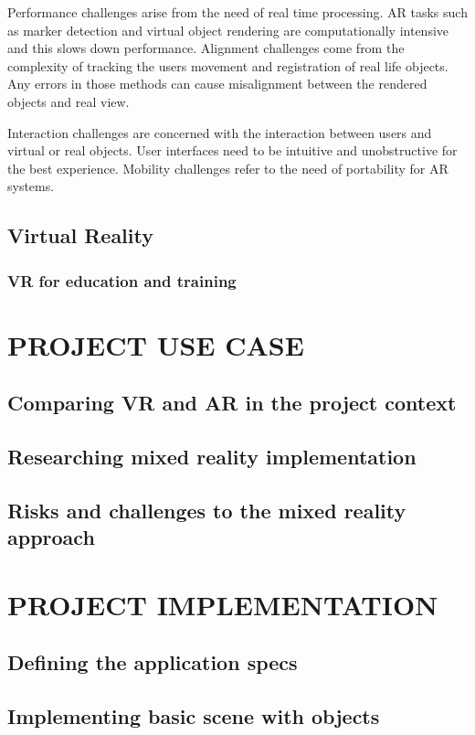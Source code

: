 \documentclass[12pt, a4paper,oneside, nocenter]{thesis}
\begin{document}
Performance challenges arise from the need of real time processing. AR tasks such as marker detection
and virtual object rendering are computationally intensive and this slows down performance.
Alignment challenges come from the complexity of tracking the users movement and registration of real
life objects. Any errors in those methods can cause misalignment between the rendered objects and
real view.\par
Interaction challenges are concerned with the interaction between users and virtual or real objects.
User interfaces need to be intuitive and unobstructive for the best experience. Mobility challenges refer
to the need of portability for AR systems. 

\section{Virtual Reality}
\par
\subsection{VR for education and training}
\par
\chapter{\MakeUppercase{Project use case}}
\section{Comparing VR and AR in the project context}
\section{Researching mixed reality implementation}
\section{Risks and challenges to the mixed reality approach}
\par
\chapter{\MakeUppercase{Project implementation}}
\section{Defining the application specs}
\section{Implementing basic scene with objects}
\end{document}
